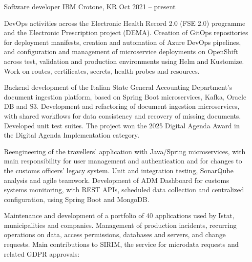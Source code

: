 \documentclass[]{style}
\begin{document}
\makecvheader


\begin{cventries}
	\cventry
	{Software developer}
	{IBM}
	{Crotone, KR}
	{Oct 2021 -- present}
	{\begin{cventryparagraph}
		\item {}
		\item {DevOps activities across the Electronic Health Record 2.0 (FSE 2.0) programme and the Electronic Prescription project (DEMA). Creation of GitOps repositories for deployment manifests, creation and automation of Azure DevOps pipelines, and configuration and management of microservice deployments on OpenShift across test, validation and production environments using Helm and Kustomize. Work on routes, certificates, secrets, health probes and resources.}
		\item {}
		\item {Backend development of the Italian State General Accounting Department's document ingestion platform, based on Spring Boot microservices, Kafka, Oracle DB and S3. Development and refactoring of document ingestion microservices, with shared workflows for data consistency and recovery of missing documents. Developed unit test suites. The project won the 2025 Digital Agenda Award in the Digital Agenda Implementation category.}
		\item {}
		\item {Reengineering of the travellers' application with Java/Spring microservices, with main responsibility for user management and authentication and for changes to the customs officers' legacy system. Unit and integration testing, SonarQube analysis and agile teamwork. Development of ADM Dashboard for customs systems monitoring, with REST APIs, scheduled data collection and centralized configuration, using Spring Boot and MongoDB.}
		\item {}
		\item {Maintenance and development of a portfolio of 40 applications used by Istat, municipalities and companies. Management of production incidents, recurring operations on data, access permissions, databases and servers, and change requests. Main contributions to SIRIM, the service for microdata requests and related GDPR approvals:}

\end{cventryparagraph}}
\end{cventries}
\end{document}
